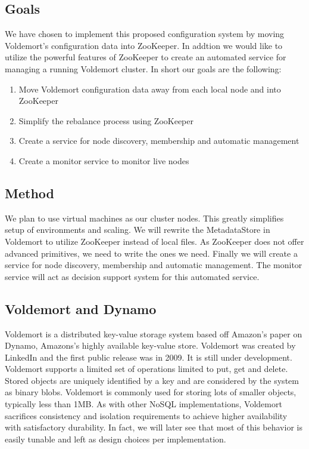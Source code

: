 \subsection{Goals}
We have chosen to implement this proposed configuration system by moving Voldemort's configuration data into ZooKeeper. In addtion we would like to utilize the powerful features of ZooKeeper to create an automated service for managing a running Voldemort cluster. In short our goals are the following:

\begin{enumerate}
	\item{Move Voldemort configuration data away from each local node and into ZooKeeper}
	\item{Simplify the rebalance process using ZooKeeper}
	\item{Create a service for node discovery, membership and automatic management}
	\item{Create a monitor service to monitor live nodes}
\end{enumerate}

\subsection{Method}
We plan to use virtual machines as our cluster nodes. This greatly simplifies setup of environments and scaling. We will rewrite the MetadataStore in Voldemort to utilize ZooKeeper instead of local files. As ZooKeeper does not offer advanced primitives, we need to write the ones we need. Finally we will create a service for node discovery, membership and automatic management. The monitor service will act as decision support system for this automated service. 

\subsection{Voldemort and Dynamo}
Voldemort is a distributed key-value storage system based off Amazon's paper on Dynamo, Amazons's highly available key-value store. Voldemort was created by LinkedIn and the first public release was in 2009. It is still under development. Voldemort supports a limited set of operations limited to put, get and delete. Stored objects are uniquely identified by a key and are considered by the system as binary blobs. Voldemort is commonly used for storing lots of smaller objects, typically less than 1MB.  As with other NoSQL implementations, Voldemort sacrifices consistency and isolation requirements to achieve higher availability with satisfactory durability. In fact, we will later see that most of this behavior is easily tunable and left as design choices per implementation.

